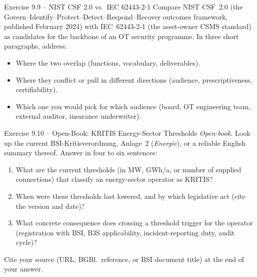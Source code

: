 \documentclass[11pt,a4paper]{article}
\begin{document}
\begin{taskbox}{Exercise 9.9 -- NIST CSF 2.0 vs.\ IEC 62443-2-1}
Compare NIST CSF~2.0 (the Govern--Identify--Protect--Detect--Respond--Recover outcomes framework, published February 2024) with IEC~62443-2-1 (the asset-owner CSMS standard) as candidates for the backbone of an OT security programme. In three short paragraphs, address:
\begin{itemize}
  \item Where the two overlap (functions, vocabulary, deliverables).
  \item Where they conflict or pull in different directions (audience, prescriptiveness, certifiability).
  \item Which one you would pick for which audience (board, OT engineering team, external auditor, insurance underwriter).
\end{itemize}
\end{taskbox}

\begin{taskbox}{Exercise 9.10 -- Open-Book: KRITIS Energy-Sector Thresholds}
\emph{Open-book.} Look up the current BSI-Kritisverordnung, Anlage~2 (\emph{Energie}), or a reliable English summary thereof. Answer in four to six sentences:
\begin{enumerate}
  \item What are the current thresholds (in MW, GWh/a, or number of supplied connections) that classify an energy-sector operator as KRITIS?
  \item When were these thresholds last lowered, and by which legislative act (cite the version and date)?
  \item What concrete consequence does crossing a threshold trigger for the operator (registration with BSI, B3S applicability, incident-reporting duty, audit cycle)?
\end{enumerate}
Cite your source (URL, BGBl.\ reference, or BSI document title) at the end of your answer.
\end{taskbox}
\end{document}
